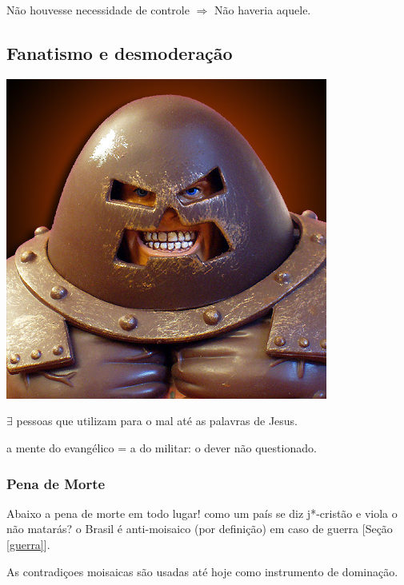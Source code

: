 \documentclass[12pt,a4paper]{article}
\begin{document}
			N\~ao houvesse necessidade de controle\cite{bomCombate} $ \Rightarrow $ N\~ao haveria aquele.

		\subsection{Fanatismo e desmodera\c{c}\~ao}
			\begin{flushright}
			\end{flushright}

			\begin{center}
			\includegraphics{juggernaut}
			\end{center}

			$ \exists $ pessoas que utilizam para o mal at\'e as palavras de Jesus.

			a mente do evang\'elico = a do militar:	o dever n\~ao questionado.

			\subsubsection{Pena de Morte}\label{penaMort}
				\begin{flushright}
				\end{flushright}

				Abaixo a pena de morte em todo lugar! como um pa\'is se diz j*-crist\~ao e viola o n\~ao matar\'as\cite{x}? o Brasil \'e anti-moisaico (por defini\c{c}\~ao) em caso de guerra [Se\c{c}\~ao \ref{guerra}].

				As contradi\c{c}oes moisaicas s\~ao usadas at\'e hoje como instrumento de domina\c{c}\~ao.
\end{document}
